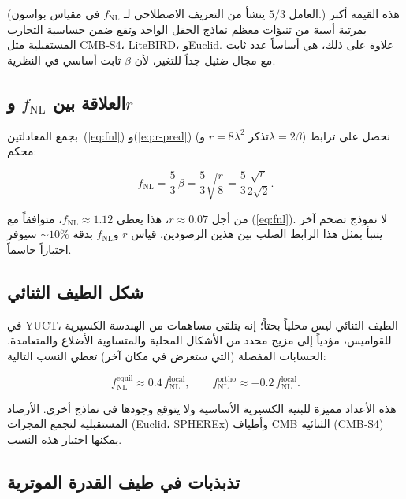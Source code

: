 \documentclass[12pt,a4paper]{article}
\begin{document}
	(العامل \(5/3\) ينشأ من التعريف الاصطلاحي لـ \(f_{\text{NL}}\) في مقياس بواسون.) هذه القيمة أكبر بمرتبة أسية من تنبؤات معظم نماذج الحقل الواحد وتقع ضمن حساسية التجارب المستقبلية مثل CMB‑S4، LiteBIRD، وEuclid. علاوة على ذلك، هي أساساً عدد ثابت مع مجال ضئيل جداً للتغير، لأن \(\beta\) ثابت أساسي في النظرية.
	
	\subsection{العلاقة بين \(f_{\text{NL}}\) و\(r\)}
	
	بجمع المعادلتين~(\ref{eq:fnl}) و(\ref{eq:r-pred}) (تذكر \(r = 8\lambda^2\) و\(\lambda = 2\beta\)) نحصل على ترابط محكم:
	
	\begin{equation}
		f_{\text{NL}} = \frac{5}{3}\,\beta = \frac{5}{3}\sqrt{\frac{r}{8}} = \frac{5}{3}\frac{\sqrt{r}}{2\sqrt{2}}.
		\label{eq:fnl-r}
	\end{equation}
	
	من أجل \(r \approx 0.07\)، هذا يعطي \(f_{\text{NL}} \approx 1.12\)، متوافقاً مع (\ref{eq:fnl}). لا نموذج تضخم آخر يتنبأ بمثل هذا الرابط الصلب بين هذين الرصودين. قياس \(r\) و\(f_{\text{NL}}\) بدقة \(\sim 10\%\) سيوفر اختباراً حاسماً.
	
	\subsection{شكل الطيف الثنائي}
	
	في YUCT، الطيف الثنائي ليس محلياً بحتاً؛ إنه يتلقى مساهمات من الهندسة الكسيرية للقواميس، مؤدياً إلى مزيج محدد من الأشكال المحلية والمتساوية الأضلاع والمتعامدة. الحسابات المفصلة (التي ستعرض في مكان آخر) تعطي النسب التالية:
	
	\begin{equation}
		f_{\text{NL}}^{\text{equil}} \approx 0.4\, f_{\text{NL}}^{\text{local}}, \qquad
		f_{\text{NL}}^{\text{ortho}} \approx -0.2\, f_{\text{NL}}^{\text{local}}.
		\label{eq:fnl-shapes}
	\end{equation}
	
	هذه الأعداد مميزة للبنية الكسيرية الأساسية ولا يتوقع وجودها في نماذج أخرى. الأرصاد المستقبلية لتجمع المجرات (Euclid، SPHEREx) وأطياف CMB الثنائية (CMB‑S4) يمكنها اختبار هذه النسب.
	
	\subsection{تذبذبات في طيف القدرة الموترية}
	
\end{document}
